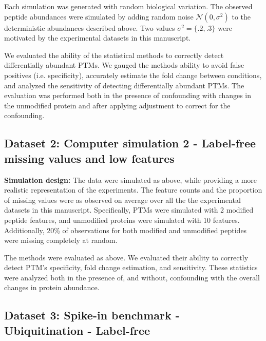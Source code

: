 \documentclass[mcp]{article}
\numberwithin{table}{section}
\begin{document}
Each simulation was generated with random biological variation. The observed peptide abundances were simulated by adding random noise $\mathcal{N}(0,\sigma^2)$ to the deterministic abundances described above. Two values $\sigma^2 = \{.2, .3\}$ were motivated by the experimental datasets in this manuscript.

\medskip {} We evaluated the ability of the statistical methods to correctly detect differentially abundant PTMs. We gauged the methods ability to avoid false positives (i.e. specificity), accurately estimate the fold change between conditions, and analyzed the sensitivity of detecting differentially abundant PTMs. The evaluation was performed both in the presence of confounding with changes in the unmodified protein and after applying adjustment to correct for the confounding.

\subsection*{Dataset 2: Computer simulation 2 - Label-free missing values and low features}
\label{sec:comp_sim_procedure2}

{\bf Simulation design:} The data were simulated as above, while providing a more realistic representation of the experiments. The feature counts and the proportion of missing values were as observed on average over all the the experimental datasets in this manuscript. Specifically, PTMs were simulated with 2 modified peptide features, and unmodified proteins were simulated with 10 features. Additionally, 20\% of observations for both modified and unmodified peptides were missing completely at random.

\medskip {} The methods were evaluated as above. We evaluated their ability to correctly detect PTM's specificity, fold change estimation, and sensitivity. These statistics were analyzed both in the presence of, and without, confounding with the overall changes in protein abundance.
 
\subsection*{Dataset 3: Spike-in benchmark - Ubiquitination - Label-free}
\label{sec:exp_proc_dataset3}
\end{document}
